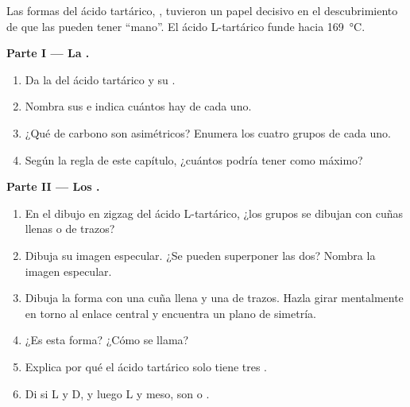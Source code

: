 \begin{problem}
\label{pb:g12:stereochemistry:1}
Las formas del ácido tartárico, , tuvieron
un papel decisivo en el descubrimiento de que las  pueden tener
``mano''. El ácido L-tartárico funde hacia \qty{169}{\celsius}.

\medskip
\noindent\textbf{Parte I --- La .}
\begin{enumerate}
  \item Da la  del ácido tartárico y su .
  \item Nombra sus  e indica cuántos hay de cada uno.
  \item ¿Qué  de carbono son asimétricos? Enumera los cuatro grupos
        de cada uno.
  \item Según la regla de este capítulo, ¿cuántos  podría
        tener como máximo?
\end{enumerate}

\medskip
\noindent\textbf{Parte II --- Los .}
\begin{enumerate}[resume]
  \item En el dibujo en zigzag del ácido L-tartárico, ¿los grupos
         se dibujan con cuñas llenas o de trazos?
  \item Dibuja su imagen especular. ¿Se pueden superponer las dos?
        Nombra la imagen especular.
  \item Dibuja la forma con una cuña llena y una de trazos. Hazla girar
        mentalmente en torno al enlace central y encuentra un plano de
        simetría.
  \item ¿Es  esta forma? ¿Cómo se llama?
  \item Explica por qué el ácido tartárico solo tiene tres
        .
  \item Di si L y D, y luego L y meso, son  o
        .
\end{enumerate}


\end{problem}
